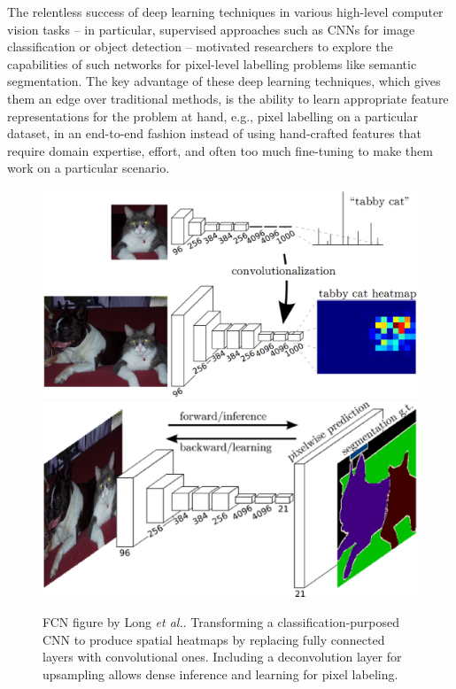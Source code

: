 The relentless success of deep learning techniques in various high-level computer vision tasks -- in particular, supervised approaches such as \acfp{CNN} for image classification or object detection \cite{Krizhevsky2012}\cite{Simonyan2014}\cite{Szegedy2015} --  motivated researchers to explore the capabilities of such networks for pixel-level labelling problems like semantic segmentation. The key advantage of these deep learning techniques, which gives them an edge over traditional methods, is the ability to learn appropriate feature representations for the problem at hand, e.g., pixel labelling on a particular dataset, in an end-to-end fashion instead of using hand-crafted features that require domain expertise, effort, and often too much fine-tuning to make them work on a particular scenario.

\begin{figure}[!b]
	\centering
	\includegraphics[width=\linewidth]{Figures/Segmentation/convolutionalization.eps}
	\includegraphics[width=0.86\linewidth]{Figures/Segmentation/fcn.eps}
	\caption{\acl{FCN} figure by Long \emph{et al.}\cite{Long2015}. Transforming a classification-purposed \ac{CNN} to produce spatial heatmaps by replacing fully connected layers with convolutional ones. Including a deconvolution layer for upsampling allows dense inference and learning for pixel labeling.}
	\label{fig:convolutionalization}
\end{figure}

